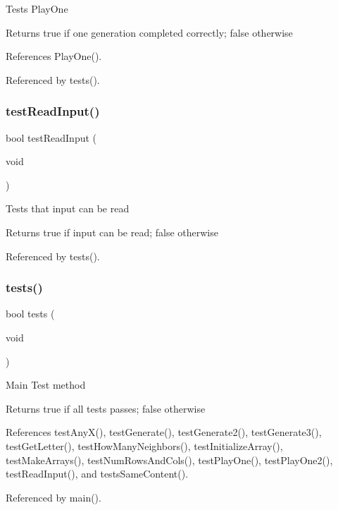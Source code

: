 Tests Play\+One \begin{DoxyReturn}{Returns}
true if one generation completed correctly; false otherwise 
\end{DoxyReturn}


References Play\+One().



Referenced by tests().

\mbox{\label{tests_8h_aa89f64db87aebe77bd891e2894595e4e}} 
\subsubsection{test\+Read\+Input()}
{\footnotesize\ttfamily bool test\+Read\+Input (\begin{DoxyParamCaption}\item[{void}]{ }\end{DoxyParamCaption})}

Tests that input can be read \begin{DoxyReturn}{Returns}
true if input can be read; false otherwise 
\end{DoxyReturn}


Referenced by tests().

\mbox{\label{tests_8h_a5e6e6e78df62797046c9ea173550a68a}} 
\subsubsection{tests()}
{\footnotesize\ttfamily bool tests (\begin{DoxyParamCaption}\item[{void}]{ }\end{DoxyParamCaption})}

Main Test method \begin{DoxyReturn}{Returns}
true if all tests passes; false otherwise 
\end{DoxyReturn}


References test\+Any\+X(), test\+Generate(), test\+Generate2(), test\+Generate3(), test\+Get\+Letter(), test\+How\+Many\+Neighbors(), test\+Initialize\+Array(), test\+Make\+Arrays(), test\+Num\+Rows\+And\+Cols(), test\+Play\+One(), test\+Play\+One2(), test\+Read\+Input(), and tests\+Same\+Content().



Referenced by main().

